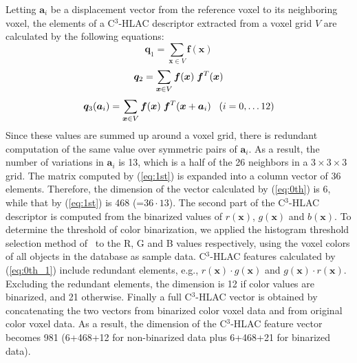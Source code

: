 \documentclass[a4paper, 10 pt, conference]{sty/ieeeconf}
\begin{document}
%
Letting ${\bm a_i}$ be a displacement vector from the reference voxel to its neighboring voxel, 
the elements of a C$^3$-HLAC descriptor extracted from a voxel grid $V$ are calculated by the following equations:
\begin{equation}\label{eq:0th}
  {\bm q_1} = \sum_{{\bm x} \in V} \bm{f}({\bm x})
\end{equation}
\begin{equation}\label{eq:0th_1}
  {\bm q_2} = \sum_{{\bm x} \in V} \bm{f}({\bm x}) \hspace{1mm}\bm{f}^T({\bm x}) \\
\end{equation}
\begin{equation}\label{eq:1st}
  {\bm q_3}({\bm a}_i) = \sum_{{\bm x} \in V} \bm{f}({\bm x}) \hspace{1mm}\bm{f}^T({\bm x}+{\bm a_i}) \;\;\; (i=0, \dots 12) \\
\end{equation}
%
Since these values are summed up around a voxel grid, there is redundant computation of the 
same value over symmetric pairs of ${\bm a_i}$. 
As a result, the number of variations in ${\bm a_i}$ is 13, which is a half of the 26 neighbors in a $3\times3\times3$ grid.
The matrix computed by (\ref{eq:1st}) is expanded into a column vector of 36 elements.
Therefore, the dimension of the vector calculated by (\ref{eq:0th}) is 6, while that by 
(\ref{eq:1st}) is 468 (=$36\cdot13$).
The second part of the C$^3$-HLAC descriptor is computed from the binarized values of $r(\bm{x})$, $g(\bm{x})$ 
and $b(\bm{x})$. 
To determine the threshold of color binarization, 
    we applied the histogram threshold selection method of~\cite{otsu1979} to the R, G and B values respectively, 
    using the voxel colors of all objects in the database as sample data.
C$^3$-HLAC features calculated by (\ref{eq:0th_1}) include redundant elements, e.g., $r(\bm{x})\cdot g(\bm{x})$ and $g(\bm{x})\cdot r(\bm{x})$.
Excluding the redundant elements, the dimension is 12 if color values are binarized, and 21 otherwise. %
Finally a full C$^3$-HLAC vector is obtained by concatenating the two vectors from binarized 
color voxel data and from original color voxel data. As a result, the dimension of the C$^3$-HLAC feature vector 
becomes 981 (6+468+12 for non-binarized data plus 6+468+21 for binarized data). 
\end{document}
